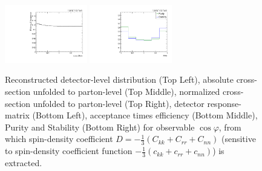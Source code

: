\begin{figure}[htb]
\begin{center}
 \includegraphics[width=0.32\textwidth]{fig_fullRun2UL/unfolding/combined/TotEff_ll_cHel.pdf}
 \includegraphics[width=0.32\textwidth]{fig_fullRun2UL/unfolding/combined/PurStab_ll_cHel.pdf} \\
\caption{Reconstructed detector-level distribution (Top Left), absolute cross-section unfolded to parton-level (Top Middle), normalized cross-section unfolded to parton-level (Top Right), detector response-matrix (Bottom Left), acceptance times efficiency (Bottom Middle), Purity and Stability (Bottom Right) for  observable $\cos\varphi$, from which spin-density coefficient $D = -\frac{1}{3}(C_{kk} + C_{rr} + C_{nn})$ (sensitive to spin-density coefficient function $-\frac{1}{3}(c_{kk} + c_{rr} + c_{nn})$) is extracted.}
\label{fig:ll_cHel}
\end{center}
\end{figure}
\clearpage
